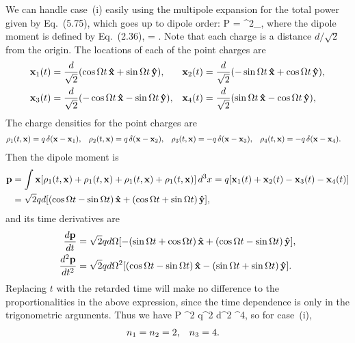 \begin{solution}
	We can handle case~(i) easily using the multipole expansion for the total power given by Eq.~(5.75), which goes up to dipole order:
	\beqn \label{power}
		P =  ^2_\ret,
	\eeqn
	where the dipole moment is defined by Eq.~(2.36),
	\beqn \label{dipole}
		\vp = \int \vx \rho \dcx.
	\eeqn
	Note that each charge is a distance $d / \sqrt{2}$ from the origin.  The locations of each of the point charges are
	\begin{align}
		\vb{x}_1(t) &= \frac{d}{\sqrt{2}} (\cos \Omega t \,\vb{\hat{x}} + \sin \Omega t \,\vb{\hat{y}}), &
		\vb{x}_2(t) &= \frac{d}{\sqrt{2}} (-\sin \Omega t \,\vb{\hat{x}} + \cos \Omega t \,\vb{\hat{y}}), \notag \\
		\vb{x}_3(t) &= \frac{d}{\sqrt{2}} (-\cos \Omega t \,\vb{\hat{x}} - \sin \Omega t \,\vb{\hat{y}}), &
		\vb{x}_4(t) &= \frac{d}{\sqrt{2}} (\sin \Omega t \,\vb{\hat{x}} - \cos \Omega t \,\vb{\hat{y}}), \label{locs}
	\end{align}
	The charge densities for the point charges are
	\begin{align*}
		\rho_1(t, \vb{x}) &= q \, \delta(\vb{x} - \vb{x}_1), &
		\rho_2(t, \vb{x}) &= q \, \delta(\vb{x} - \vb{x}_2), &
		\rho_3(t, \vb{x}) &= -q \, \delta(\vb{x} - \vb{x}_3), &
		\rho_4(t, \vb{x}) &= -q \, \delta(\vb{x} - \vb{x}_4).
	\end{align*}
	Then the dipole moment is
	\begin{align*}
		\vb{p} &= \int \vb{x} [ \rho_1(t, \vb{x}) + \rho_1(t, \vb{x}) + \rho_1(t, \vb{x}) + \rho_1(t, \vb{x}) ] \dd[3]{x}
		= q [ \vb{x}_1(t) + \vb{x}_2(t) - \vb{x}_3(t) - \vb{x}_4(t) ] \\
		&= \sqrt{2} q d [ (\cos \Omega t - \sin \Omega t) \,\vb{\hat{x}} + (\cos \Omega t + \sin \Omega t) \,\vb{\hat{y}} ],
	\end{align*}
	and its time derivatives are
	\begin{align*}
		\dv{\vb{p}}{t} &= \sqrt{2} q d \Omega [ -(\sin \Omega t + \cos \Omega t) \,\vb{\hat{x}} + (\cos \Omega t - \sin \Omega t) \,\vb{\hat{y}} ], \\
		\dv[2]{\vb{p}}{t} &= \sqrt{2} q d \Omega^2 [ (\cos \Omega t - \sin \Omega t) \,\vb{\hat{x}} - (\sin \Omega t + \sin \Omega t) \,\vb{\hat{y}} ].
	\end{align*}
	Replacing $t$ with the retarded time will make no difference to the proportionalities in the above expression, since the time dependence is only in the trigonometric arguments.  Thus we have
	\beq
		P \propto {}^2
		\propto q^2 d^2 \Omg^4,
	\eeq
	so for case~(i),
	\begin{align*}
		{n_1} &= {n_2} = 2, &
		{n_3} &= 4.
	\end{align*}
	

\end{solution}

